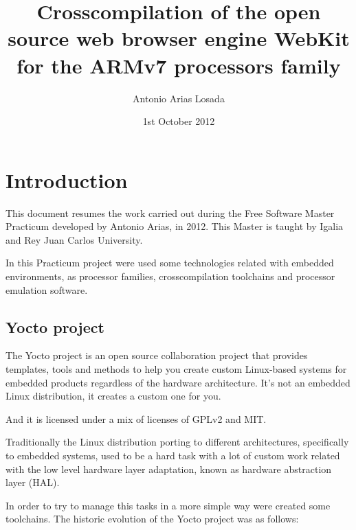 \documentclass[a4paper,11pt,openany]{report}
\title{Crosscompilation of the open source web browser engine WebKit for the ARMv7 processors family}
\author{Antonio Arias Losada}
\date{1st October 2012}
\begin{document}
\maketitle
\tableofcontents
\listoffigures


\chapter{Introduction}
This document resumes the work carried out during the Free Software Master\cite{master} Practicum developed by Antonio Arias, in 2012. This Master is taught by Igalia and Rey Juan Carlos University.

In this Practicum project were used some technologies related with embedded environments, as processor families, crosscompilation toolchains and processor emulation software.

\section{Yocto project}
The Yocto\cite{yocto} project is an open source collaboration project that provides templates, tools and methods to help you create custom Linux-based systems for embedded products regardless of the hardware architecture. It's not an embedded Linux distribution, it creates a custom one for you.

And it is licensed under a mix of licenses of GPLv2 and MIT.

Traditionally the Linux distribution porting to different architectures, specifically to embedded systems, used to be a hard task with a lot of custom work related with the low level hardware layer adaptation, known as hardware abstraction layer (HAL).

In order to try to manage this tasks in a more simple way were created some toolchains. The historic evolution of the Yocto project was as follows:
\end{document}
